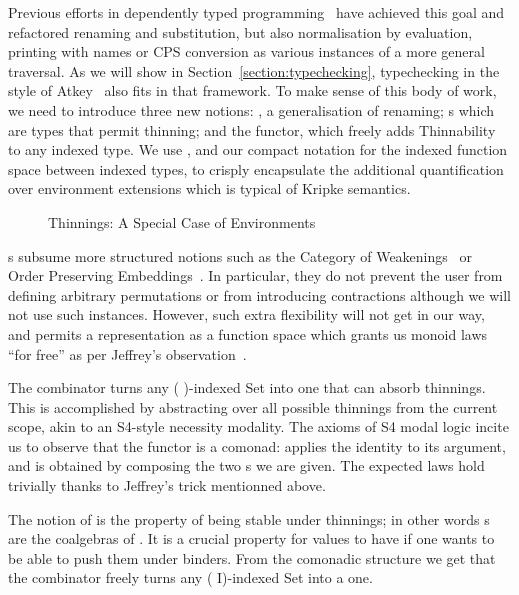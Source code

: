 Previous efforts in dependently typed
programming~\cite{benton2012strongly,allais2017type}
have achieved this goal and refactored renaming and substitution,
but also normalisation by evaluation, printing with names or CPS conversion
as various instances of a more general traversal. As we will show in Section~\ref{section:typechecking},
typechecking in the style of Atkey~\citeyear{atkey2015algebraic} also
fits in that framework. To make sense of this body of work, we
need to introduce three new notions: , a generalisation of
renaming; s which are types that permit thinning; and the
 functor, which freely adds Thinnability to any indexed type.
We use , and our compact notation for the indexed function space
between indexed types, to crisply encapsulate the additional quantification 
over environment extensions which is typical of Kripke semantics.
\label{def:thinning}
\begin{figure}[h]
\caption{Thinnings: A Special Case of Environments}
\end{figure}

s subsume more structured notions such as the Category of
Weakenings~\cite{altenkirch1995categorical} or Order Preserving
Embeddings~\cite{chapman2009type}. In particular, they do not prevent the
user from defining arbitrary permutations or from introducing contractions
although we will not use such instances. However, such extra flexibility
will not get in our way, and permits a representation as a function space
which grants us monoid laws ``for free'' as per Jeffrey's
observation~\citeyear{jeffrey2011assoc}.

The  combinator turns any ( )-indexed Set into one that can
absorb thinnings. This is accomplished by abstracting over all possible thinnings
from the current scope, akin to an S4-style necessity modality. The axioms of S4
modal logic incite us to observe that the functor  is a comonad: 
applies the identity  to its argument, and  is obtained
by composing the two s we are given. The expected laws hold trivially
thanks to Jeffrey's trick mentionned above.

The notion of  is the property of being stable under thinnings;
in other words s are the coalgebras of .
It is a crucial property for values to have if one wants to be able to push
them under binders. From the comonadic structure we get that
the  combinator freely turns any ( I)-indexed Set into a
 one.

